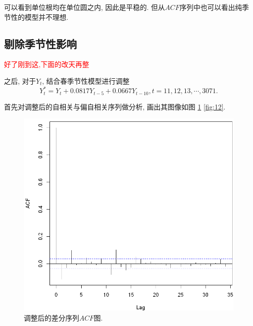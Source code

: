 \documentclass[11pt]{article}
\begin{document}
\qquad 可以看到单位根均在单位圆之内, 因此是平稳的. 但从$ACF$序列中也可以看出纯季节性的模型并不理想. 
\subsection{剔除季节性影响}





\textcolor{red}{好了刚到这,下面的改天再整}



\qquad 之后, 对于$Y_t$, 结合春季节性模型进行调整
\[
    Y_t^*=Y_t+0.0817Y_{t-5}+0.0667Y_{t-10}, t=11,12,13,\cdots,3071.
\]

首先对调整后的自相关与偏自相关序列做分析, 画出其图像如图 \ref{fig:11} \ref{fig:12}. 

\begin{center}
    \hspace{30pt}\begin{minipage}{0.45\textwidth}
        \begin{figure}
            \centering
            \hspace{-25pt}\includegraphics[width=.9\textwidth]{output_30_0}
            \caption{调整后的差分序列$ACF$图.\label{fig:11}}
        \end{figure}
    \end{minipage}
    \begin{minipage}{0.45\textwidth}
        \begin{figure}
            \centering

\end{figure}
\end{minipage}
\end{center}
\end{document}
